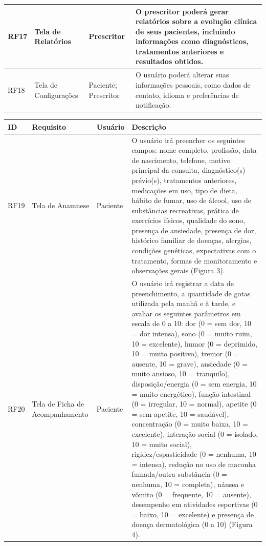 \href{}{}\documentclass[12pt,portuguese,oneside]{article}
\begin{document}
\begin{table}[H]
\begin{tabularx}{\textwidth}{|>{\raggedright\arraybackslash}p{1cm}|>{\raggedright\arraybackslash}p{3cm}|>{\raggedright\arraybackslash}p{2cm}|>{\raggedright\arraybackslash}X|}
\hline
RF17 & Tela de Relatórios & Prescritor & O prescritor poderá gerar relatórios sobre a evolução clínica de seus pacientes, incluindo informações como diagnósticos, tratamentos anteriores e resultados obtidos.\\
\hline
RF18 & Tela de Configurações & Paciente; Prescritor & O usuário poderá alterar suas informações pessoais, como dados de contato, idioma e preferências de notificação.\\
\hline
\end{tabularx}
\end{table}

\newpage

\begin{table}[H]
\centering
{}
\begin{tabularx}{\textwidth}{|>{\raggedright\arraybackslash}p{1cm}|>{\raggedright\arraybackslash}p{3cm}|>{\raggedright\arraybackslash}p{2cm}|>{\raggedright\arraybackslash}X|}
\hline
\rowcolor{gray!20}
\textbf{ID} & \textbf{Requisito} & \textbf{Usuário} & \textbf{Descrição}\\
\hline
RF19 & Tela de Anamnese & Paciente & O usuário irá preencher os seguintes campos: nome completo, profissão, data de nascimento, telefone, motivo principal da consulta, diagnóstico(s) prévio(s), tratamentos anteriores, medicações em uso, tipo de dieta, hábito de fumar, uso de álcool, uso de substâncias recreativas, prática de exercícios físicos, qualidade do sono, presença de ansiedade, presença de dor, histórico familiar de doenças, alergias, condições genéticas, expectativas com o tratamento, formas de monitoramento e observações gerais (Figura 3).\\
\hline
RF20 & Tela de Ficha de Acompanhamento & Paciente & O usuário irá registrar a data de preenchimento, a quantidade de gotas utilizada pela manhã e à tarde, e avaliar os seguintes parâmetros em escala de 0 a 10: dor (0 = sem dor, 10 = dor intensa), sono (0 = muito ruim, 10 = excelente), humor (0 = deprimido, 10 = muito positivo), tremor (0 = ausente, 10 = grave), ansiedade (0 = muito ansioso, 10 = tranquilo), disposição/energia (0 = sem energia, 10 = muito energético), função intestinal (0 = irregular, 10 = normal), apetite (0 = sem apetite, 10 = saudável), concentração (0 = muito baixa, 10 = excelente), interação social (0 = isolado, 10 = muito social), rigidez/espasticidade (0 = nenhuma, 10 = intensa), redução no uso de maconha fumada/outra substância (0 = nenhuma, 10 = completa), náusea e vômito (0 = frequente, 10 = ausente), desempenho em atividades esportivas (0 = baixo, 10 = excelente) e presença de doença dermatológica (0 a 10) (Figura 4).\\

\end{tabularx}
\end{table}
\end{document}
